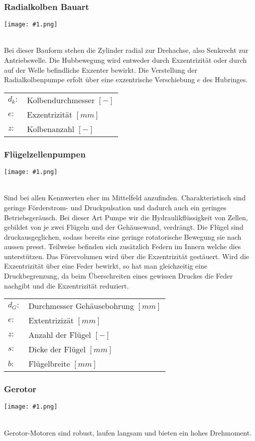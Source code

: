 \documentclass[landscape,a4paper,10pt]{article}
\newcommand{\graphiccol}[1]{
\noindent
\begin{minipage}{\columnwidth}
\centering
\texttt{[image: \#1.png]}
\end{minipage}
\medskip \\
}
\begin{document}
\begin{multicols*}{3}
\subsubsection{Radialkolben Bauart}
\graphiccol{radialpumpe}
Bei dieser Bauform stehen die Zylinder radial zur Drehachse, also Senkrecht zur Antriebswelle. Die Hubbewegung wird entweder durch Exzentrizität oder durch auf der Welle befindliche Exzenter bewirkt. Die Verstellung der Radialkolbenpumpe erfolt über eine exzentrische Verschiebung $e$ des Hubringes. 

\begin{tabular}{ll}
$d_k:$ & Kolbendurchmesser $[-]$ \\
$e:$ & Exzentrizität $[mm]$ \\
$z:$ & Kolbenanzahl $[-]$ 
\end{tabular}



\subsubsection{Flügelzellenpumpen}
\graphiccol{fluegelzellenpumpe}
Sind bei allen Kennwerten eher im Mittelfeld anzufinden.
Charakteristisch sind geringe Förderstrom- und Druckpulsation und dadurch auch ein geringes Betriebsgeräusch. Bei dieser Art Pumpe wir die Hydraulikflüssigkeit von Zellen, gebildet von je zwei Flügeln und der Gehäusewand, verdrängt. Die Flügel sind druckausgeglichen, sodass bereits eine geringe rotatorische Bewegung sie nach aussen presst. Teilweise befinden sich zusätzlich Federn im Innern welche dies unterstützen. Das Förervolumen wird über die Exzentrizität gestäuert. Wird die Exzentrizität über eine Feder bewirkt, so hat man gleichzeitig eine Druckbegrenzung, da beim Überschreiten eines gewissen Druckes die Feder nachgibt und die Exzentrizität reduziert. 

\begin{tabular}{ll}
$d_G:$ & Durchmesser Gehäusebohrung $[mm]$\\
$e:$ & Extentrizizät $[mm]$\\
$z:$ & Anzahl der Flügel $[-]$\\
$s:$ & Dicke der Flügel $[mm]$\\
$b:$ & Flügelbreite $[mm]$
\end{tabular}


\subsubsection{Gerotor}
\graphiccol{gerotor}
Gerotor-Motoren sind robust, laufen langsam und bieten ein hohes Drehmoment. 



\end{multicols*}
\end{document}
